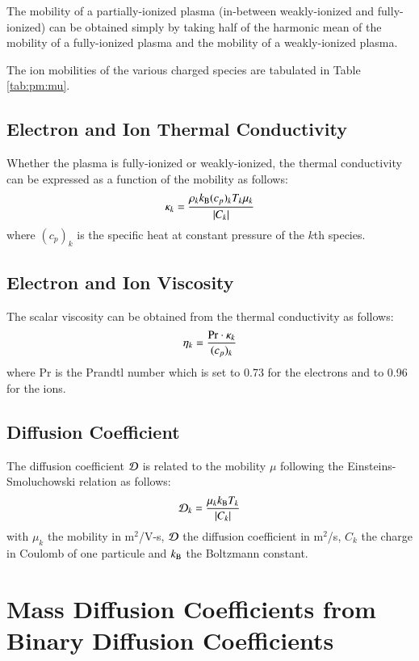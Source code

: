 \documentclass{warpdoc}
\begin{document}
The mobility of a partially-ionized plasma (in-between weakly-ionized and fully-ionized) can be obtained simply by taking half of the harmonic mean of the mobility of a fully-ionized plasma and the mobility of a weakly-ionized plasma. 

The ion mobilities of the various charged species are tabulated in Table \ref{tab:pm:mu}. 



\subsection{Electron and Ion Thermal Conductivity}

Whether the plasma is fully-ionized or weakly-ionized, the thermal conductivity can be expressed as a function of the mobility as follows:
%
\begin{equation}
\kappa_k =     \frac{ \rho_k k_{\rm B}  (c_p)_k T_k \mu_k}{|C_k|} 
\end{equation}
%
where $(c_p)_k$ is the specific heat at constant pressure of the $k$th species.

\subsection{Electron and Ion Viscosity}

The scalar viscosity can be obtained from the thermal conductivity as follows:
%
\begin{equation}
\eta_k = \frac{{\rm Pr} \cdot \kappa_k}{(c_p)_k}
\end{equation}
% 
where Pr is the Prandtl number which is set to 0.73 for the electrons and to 0.96 for the ions.

\subsection{Diffusion Coefficient}

The diffusion coefficient ${\cal D}$ is related to the mobility $\mu$ following the Einsteins-Smoluchowski relation as follows:
%
\begin{equation}
    {\cal D}_k= \frac{\mu_k k_{\rm B} T_k}{|C_k|}
\end{equation}
%
with $\mu_k$ the mobility in m$^2$/V-s, $\cal D$ the diffusion coefficient in m$^2$/s, $C_k$ the charge in Coulomb of one particule and $k_{\rm B}$ the Boltzmann constant.


\section{Mass Diffusion Coefficients from Binary Diffusion Coefficients}
\end{document}
